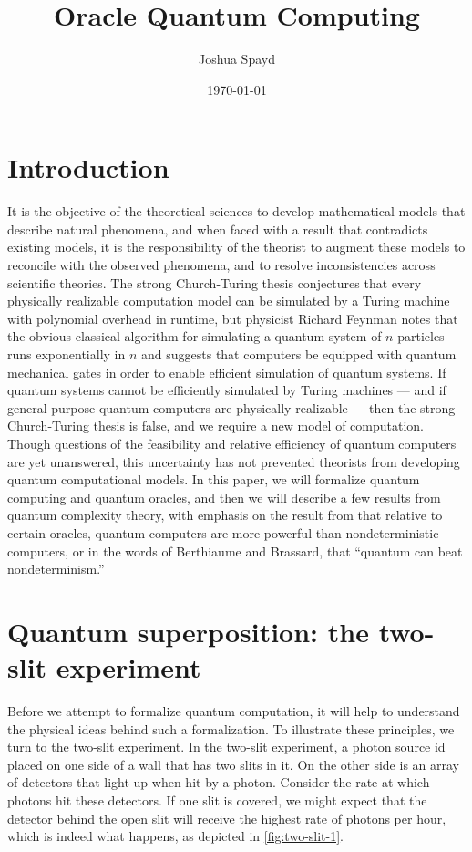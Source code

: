 \documentclass[12pt]{article}
\title{Oracle Quantum Computing}
\author{Joshua Spayd}
\date{\today}
\begin{document}
\maketitle

\section{Introduction}
It is the objective of the theoretical sciences to develop mathematical models
that describe natural phenomena, and when faced with a result that contradicts
existing models, it is the responsibility of the theorist to augment these
models to reconcile with the observed phenomena, and to resolve
inconsistencies across scientific theories. The strong Church-Turing thesis
conjectures that every physically realizable computation model can be
simulated by a Turing machine with polynomial overhead in runtime, but
physicist Richard Feynman \cite{Fey82} notes that the obvious classical
algorithm for simulating a quantum system of $n$ particles runs exponentially
in $n$ and suggests that computers be equipped with quantum mechanical gates
in order to enable efficient simulation of quantum systems. If quantum systems
cannot be efficiently simulated by Turing machines --- and if general-purpose
quantum computers are physically realizable --- then the strong Church-Turing
thesis is false, and we require a new model of computation. Though questions
of the feasibility and relative efficiency of quantum computers are yet
unanswered, this uncertainty has not prevented theorists from developing
quantum computational models. In this paper, we will formalize quantum computing
and quantum oracles, and then we will describe a few results from quantum
complexity theory, with emphasis on the result from \cite{BB92a} that relative to
certain oracles, quantum computers are more powerful than nondeterministic
computers, or in the words of  Berthiaume and Brassard, that ``quantum can beat
nondeterminism.''


\section{Quantum superposition: the two-slit experiment}
Before we attempt to formalize quantum computation, it will help to understand
the physical ideas behind such a formalization. To illustrate these principles,
we turn to the two-slit experiment. In the two-slit experiment, a photon source
id placed on one side of a wall that has two slits in it. On the other side is
an array of detectors that light up when hit by a photon. Consider the rate at
which photons hit these detectors. If one slit is covered, we might expect that
the detector behind the open slit will receive the highest rate of photons per
hour, which is indeed what happens, as depicted in \cref{fig:two-slit-1}.
\end{document}
